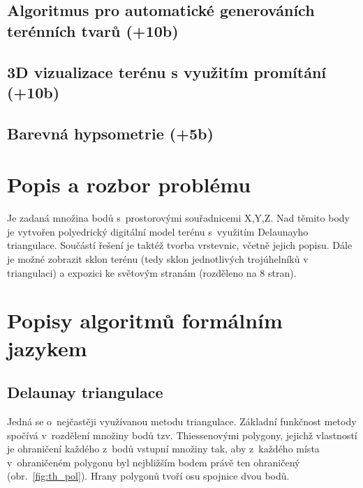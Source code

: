 \documentclass[a4paper, 12pt, oneside, titlepage]{article} %
\begin{document}
\subsection{Algoritmus pro automatické generováních terénních tvarů (+10b)}

\subsection{3D vizualizace terénu s využitím promítání (+10b)}

\subsection{Barevná hypsometrie (+5b)}



\section{Popis a rozbor problému}
Je zadaná množina bodů s~prostorovými souřadnicemi X,Y,Z. Nad těmito body je vytvořen polyedrický digitální model terénu s~využitím Delaunayho triangulace. Součástí řešení je taktéž tvorba vrstevnic, včetně jejich popisu. Dále je možné zobrazit sklon terénu (tedy sklon jednotlivých trojúhelníků v triangulaci) a expozici ke světovým stranám (rozděleno na 8 stran).


\section{Popisy algoritmů formálním jazykem} \label{popisalg}

\subsection{Delaunay triangulace} \label{dt}
Jedná se o~nejčastěji využívanou metodu triangulace. Základní funkčnost metody spočívá v~rozdělení množiny bodů tzv. Thiessenovými polygony, jejichž vlastností je ohraničení každého z~bodů vstupní množiny tak, aby z~každého místa v~ohraničeném polygonu byl nejbližším bodem právě ten ohraničený (obr.~\ref{fig:th_pol}). Hrany polygonů tvoří osu spojnice dvou bodů.
\end{document}
